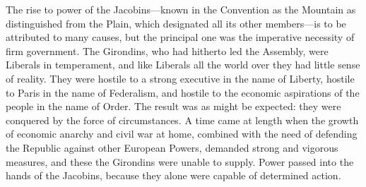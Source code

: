 \documentclass{book}
\begin{document}
The rise to power of the Jacobins—known in the Convention as the Mountain as distinguished from the Plain, which designated all its other members—is to be attributed to many causes, but the principal one was the imperative necessity of firm government. The Girondins, who had hitherto led the Assembly, were Liberals in temperament, and like Liberals all the world over they had little sense of reality. They were hostile to a strong executive in the name of Liberty, hostile to Paris in the name of Federalism, and hostile to the economic aspirations of the people in the name of Order. The result was as might be expected: they were conquered by the force of circumstances. A time came at length when the growth of economic anarchy and civil war at home, combined with the need of defending the Republic against other European Powers, demanded strong and vigorous measures, and these the Girondins were unable to supply. Power passed into the hands of the Jacobins, because they alone were capable of determined action.
\end{document}
